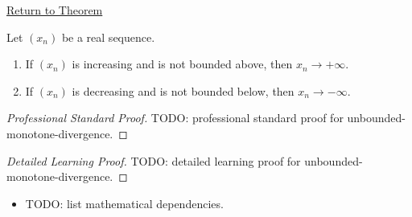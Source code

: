 \newpage
{}
\label{prf:unbounded-monotone-divergence}

\begin{remark*}[Return]
\hyperref[thm:unbounded-monotone-divergence]{Return to Theorem}
\end{remark*}

\begin{theorem*}
Let $(x_n)$ be a real sequence.
\begin{enumerate}[label=(\alph*)]
  \item If $(x_n)$ is increasing and is not bounded above, then
  $x_n\to+\infty$.
  \item If $(x_n)$ is decreasing and is not bounded below, then
  $x_n\to-\infty$.
\end{enumerate}

\smallskip
\noindent
\end{theorem*}

\begin{proof}[Professional Standard Proof]
\LRAProofBodyStart
TODO: professional standard proof for unbounded-monotone-divergence.
\end{proof}

\begin{proof}[Detailed Learning Proof]
\LRAProofBodyStart
TODO: detailed learning proof for unbounded-monotone-divergence.
\end{proof}

\begin{remark*}
\end{remark*}

\begin{dependencies}
\begin{itemize}
  \item TODO: list mathematical dependencies.
\end{itemize}
\end{dependencies}

\clearpage
